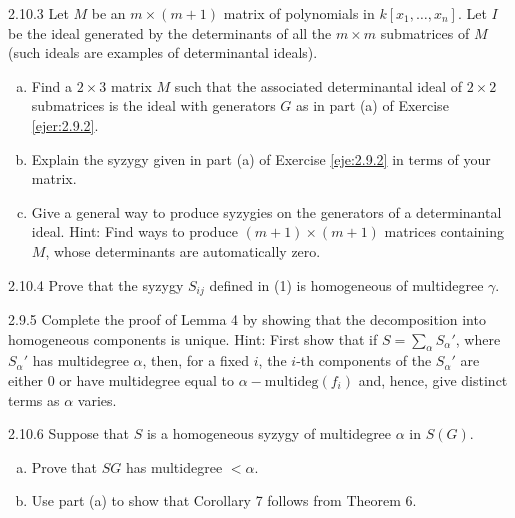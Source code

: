\documentclass[twoside]{article}
\begin{document}
\begin{ejercicio}{2.10.3}
Let $M$ be an $m × (m + 1)$ matrix of polynomials in $k[x_1, \dots , x_n]$. Let $I$ be the ideal generated
by the determinants of all the $m × m$ submatrices of $M$ (such ideals are examples
of determinantal ideals).
\begin{enumerate}[a.]
\item Find a $2×3$ matrix $M$ such that the associated determinantal ideal of $2×2$ submatrices
is the ideal with generators $G$ as in part (a) of Exercise \ref{ejer:2.9.2}.
\item Explain the syzygy given in part (a) of Exercise \ref{eje:2.9.2} in terms of your matrix.
\item Give a general way to produce syzygies on the generators of a determinantal ideal.
Hint: Find ways to produce $(m + 1) × (m + 1)$ matrices containing $M$, whose determinants
are automatically zero.
\end{enumerate}
\end{ejercicio}
\begin{solucion}

\end{solucion}

\newpage

\begin{ejercicio}{2.10.4}
Prove that the syzygy $S_{ij}$ defined in (1) is homogeneous of multidegree $γ$.
\end{ejercicio}
\begin{solucion}

\end{solucion}
\newpage

\begin{ejercicio}{2.9.5}
Complete the proof of Lemma 4 by showing that the decomposition into homogeneous
components is unique. Hint: First show that if $S =
\sum_{α} S_{α}'$, where $S_{α}'$ has multidegree
$α$, then, for a fixed $i$, the $i$-th components of the $S_{α}'$ are either 0 or have multidegree equal
to $α − \textrm{multideg}( f_i)$ and, hence, give distinct terms as $α$ varies.
\end{ejercicio}
\begin{solucion}

\end{solucion}

\newpage

\begin{ejercicio}{2.10.6}
Suppose that $S$ is a homogeneous syzygy of multidegree $α$ in $S(G)$.
\begin{enumerate}[a.]
\item Prove that $S  G$ has multidegree $< α$.
\item Use part (a) to show that Corollary 7 follows from Theorem 6.
\end{enumerate}
\end{ejercicio}
\begin{solucion}

\end{solucion}
\end{document}
